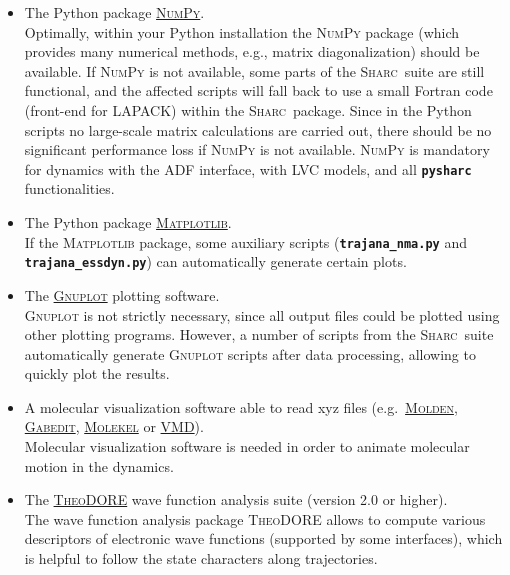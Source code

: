 \documentclass[a4paper,10pt,DIV=15,openany]{scrbook}
\newcommand{\link}[2]{\href{#1}{#2}}
\newcommand{\sharc}{\textsc{Sharc}}
\newcommand{\ttt}[1]{\textbf{\texttt{#1}}}
\begin{document}
\begin{itemize}
  \item The Python package \link{http://www.numpy.org/}{\textsc{NumPy}}.
  \\
  Optimally, within your Python installation the \textsc{NumPy} package (which provides many numerical methods, e.g., matrix diagonalization) should be available. If \textsc{NumPy} is not available, some parts of the \sharc\ suite are still functional, and the affected scripts will fall back to use a small Fortran code (front-end for LAPACK) within the \sharc\ package. Since in the Python scripts no large-scale matrix calculations are carried out, there should be no significant performance loss if \textsc{NumPy} is not available.
  \textsc{NumPy} is mandatory for dynamics with the ADF interface, with LVC models, and all \ttt{pysharc} functionalities.
  \medskip
  \item The Python package \link{https://matplotlib.org/}{\textsc{Matplotlib}}.
  \\
  If the \textsc{Matplotlib} package, some auxiliary scripts (\ttt{trajana\_nma.py} and \ttt{trajana\_essdyn.py}) can automatically generate certain plots.
  \medskip
  \item The \link{http://www.gnuplot.info/}{\textsc{Gnuplot}} plotting software.
  \\
  \textsc{Gnuplot} is not strictly necessary, since all output files could be plotted using other plotting programs. However, a number of scripts from the \sharc\ suite automatically generate \textsc{Gnuplot} scripts after data processing, allowing to quickly plot the results.
  \medskip
  \item A molecular visualization software able to read xyz files (e.g.\ \link{http://www.cmbi.ru.nl/molden/molden.html}{\textsc{Molden}}, \link{http://gabedit.sourceforge.net/}{\textsc{Gabedit}}, \link{http://molekel.cscs.ch/wiki/pmwiki.php}{\textsc{Molekel}} or \link{http://www.ks.uiuc.edu/Research/vmd/}{VMD}).
  \\
  Molecular visualization software is needed in order to animate molecular motion in the dynamics.
  \medskip
  \item The \link{http://theodore-qc.sourceforge.net/}{\textsc{TheoDORE}} wave function analysis suite (version 2.0 or higher).
  \\
  The wave function analysis package \textsc{TheoDORE} allows to compute various descriptors of electronic wave functions (supported by some interfaces), which is helpful to follow the state characters along trajectories.

\end{itemize}
\end{document}
